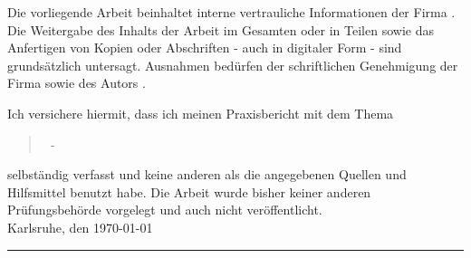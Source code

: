 \normalsize

Die vorliegende Arbeit beinhaltet interne vertrauliche Informationen der Firma
\firma. Die Weitergabe des Inhalts der Arbeit im Gesamten oder in
Teilen sowie das Anfertigen von Kopien oder Abschriften - auch in digitaler Form
- sind grundsätzlich untersagt. Ausnahmen bedürfen der schriftlichen Genehmigung
der Firma \firma sowie des Autors \autor.

\pagebreak

Ich versichere hiermit, dass ich meinen Praxisbericht mit dem Thema
\begin{quote}
\textit{\titel\ - \untertitel}
\end{quote}
selbständig verfasst und keine anderen als die angegebenen Quellen und Hilfsmittel benutzt habe. Die Arbeit wurde bisher keiner anderen Prüfungsbehörde vorgelegt und auch nicht veröffentlicht.\\[10ex]

Karlsruhe, den \today \\[4ex]


\rule[-0.2cm]{5cm}{0.5pt} \\

\textsc{\autor} \\[10ex]